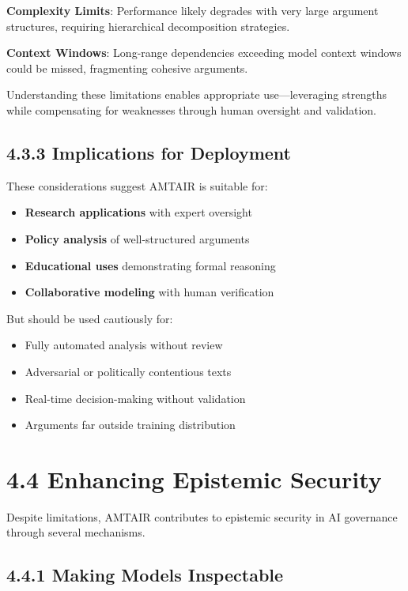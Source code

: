 \documentclass[
  11pt,
  letterpaper,
]{book}
\providecommand{\tightlist}{%
  \setlength{\itemsep}{0pt}\setlength{\parskip}{0pt}}
\begin{document}
\textbf{Complexity Limits}: Performance likely degrades with very large
argument structures, requiring hierarchical decomposition strategies.

\textbf{Context Windows}: Long-range dependencies exceeding model
context windows could be missed, fragmenting cohesive arguments.

Understanding these limitations enables appropriate use---leveraging
strengths while compensating for weaknesses through human oversight and
validation.

\subsection{4.3.3 Implications for
Deployment}\label{sec-deployment-implications}

These considerations suggest AMTAIR is suitable for:

\begin{itemize}
\tightlist
\item
  \textbf{Research applications} with expert oversight
\item
  \textbf{Policy analysis} of well-structured arguments
\item
  \textbf{Educational uses} demonstrating formal reasoning
\item
  \textbf{Collaborative modeling} with human verification
\end{itemize}

But should be used cautiously for:

\begin{itemize}
\tightlist
\item
  Fully automated analysis without review
\item
  Adversarial or politically contentious texts
\item
  Real-time decision-making without validation
\item
  Arguments far outside training distribution
\end{itemize}

\section{4.4 Enhancing Epistemic Security}\label{sec-epistemic-security}

Despite limitations, AMTAIR contributes to epistemic security in AI
governance through several mechanisms.

\subsection{4.4.1 Making Models
Inspectable}\label{sec-inspectable-models}
\end{document}
